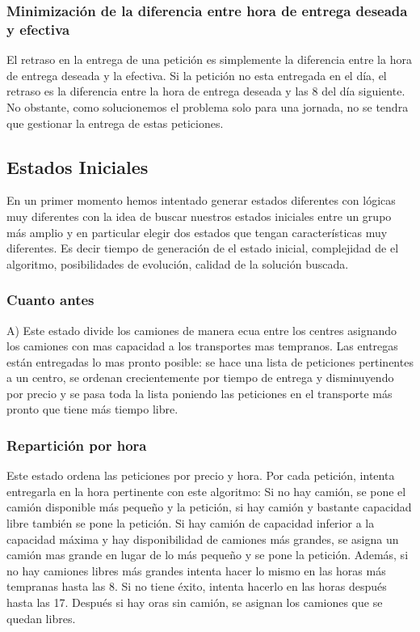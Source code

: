 \documentclass{article}
\begin{document}
\subsubsection{Minimización de la diferencia entre hora de entrega deseada y
efectiva}
El retraso en la entrega de una petición es simplemente la diferencia entre la
hora de entrega deseada y la efectiva. Si la petición no esta entregada en el
día, el retraso es la diferencia entre la hora de entrega deseada y las 8 del
día siguiente. No obstante, como solucionemos el problema solo para una jornada,
no se tendra que gestionar la entrega de estas peticiones.

\subsection{Estados Iniciales}

En un primer momento hemos intentado generar estados diferentes con lógicas muy diferentes con la idea de buscar nuestros estados iniciales entre un grupo más amplio y en particular elegir dos estados que tengan características muy diferentes. Es decir tiempo de generación de el estado inicial, complejidad de el algoritmo, posibilidades de evolución, calidad de la solución buscada.

\subsubsection{Cuanto antes}
A) Este estado divide los camiones de manera ecua entre los centres asignando los camiones con mas capacidad a los transportes mas tempranos. Las entregas están entregadas lo mas pronto posible: se hace una lista de peticiones pertinentes a un centro, se ordenan crecientemente por tiempo de entrega y disminuyendo por precio y se pasa toda la lista poniendo las peticiones en el transporte más pronto que tiene más tiempo libre.

\subsubsection{Repartición por hora}
Este estado ordena las peticiones por precio y hora. Por cada petición, intenta entregarla en la hora pertinente con este algoritmo:
Si no hay camión, se pone el camión disponible más pequeño y la petición, si hay camión y bastante capacidad libre también se pone la petición. Si hay camión de capacidad inferior a la capacidad máxima y hay disponibilidad de camiones más grandes, se asigna un camión mas grande en lugar de lo más pequeño y se pone la petición. Además, si no hay camiones libres más grandes intenta hacer lo mismo en las horas más tempranas hasta las 8. Si no tiene éxito, intenta hacerlo en las horas después hasta las 17.
Después si hay oras sin camión, se asignan los camiones que se quedan libres.
\end{document}
